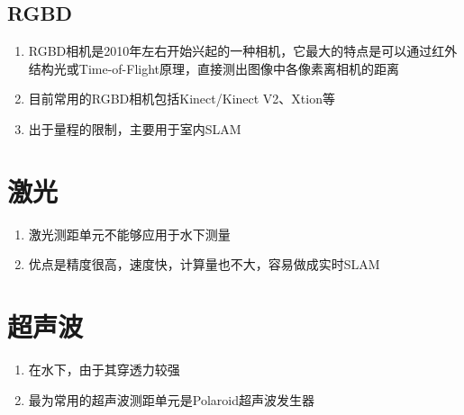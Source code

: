 \subsection{RGBD}
\begin{enumerate}
\item RGBD相机是2010年左右开始兴起的一种相机，它最大的特点是可以通过红外结构光或Time-of-Flight原理，直接测出图像中各像素离相机的距离
\item 目前常用的RGBD相机包括Kinect/Kinect V2、Xtion等
\item 出于量程的限制，主要用于室内SLAM
\end{enumerate}

\section{激光}
\begin{enumerate}
\item 激光测距单元不能够应用于水下测量
\item 优点是精度很高，速度快，计算量也不大，容易做成实时SLAM
\end{enumerate}




\section{超声波}
\begin{enumerate}
\item 在水下，由于其穿透力较强
\item 最为常用的超声波测距单元是Polaroid超声波发生器
\end{enumerate}